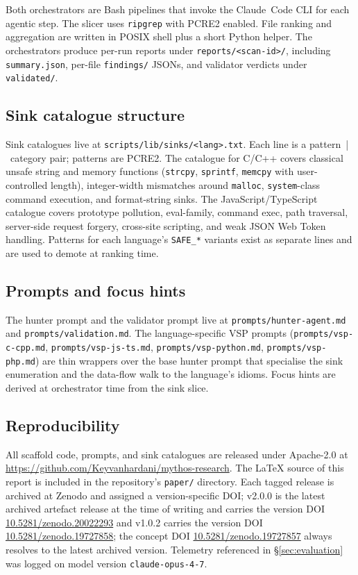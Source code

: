 \documentclass[11pt,a4paper]{article}
\begin{document}
\noindent
Both orchestrators are Bash pipelines that invoke the Claude~Code CLI
for each agentic step. The slicer uses \texttt{ripgrep} with PCRE2
enabled. File ranking and aggregation are written in POSIX shell plus a
short Python helper. The orchestrators produce per-run reports under
\texttt{reports/\textless scan-id\textgreater/}, including
\texttt{summary.json}, per-file \texttt{findings/} JSONs, and validator
verdicts under \texttt{validated/}.

\subsection{Sink catalogue structure}

Sink catalogues live at \texttt{scripts/lib/sinks/\textless lang\textgreater.txt}. Each
line is a pattern~|~category pair; patterns are PCRE2. The catalogue for
C/C++ covers classical unsafe string and memory functions
(\texttt{strcpy}, \texttt{sprintf}, \texttt{memcpy} with user-controlled
length), integer-width mismatches around \texttt{malloc},
\texttt{system}-class command execution, and format-string sinks. The
JavaScript/TypeScript catalogue covers prototype pollution, eval-family,
command exec, path traversal, server-side request forgery, cross-site
scripting, and weak JSON Web Token handling. Patterns for each
language's \texttt{SAFE\_*} variants exist as separate lines and are
used to demote at ranking time.

\subsection{Prompts and focus hints}

The hunter prompt and the validator prompt live at
\texttt{prompts/hunter-agent.md} and \texttt{prompts/validation.md}. The
language-specific VSP prompts (\texttt{prompts/vsp-c-cpp.md},
\texttt{prompts/vsp-js-ts.md}, \texttt{prompts/vsp-python.md},
\texttt{prompts/vsp-php.md}) are thin wrappers over the base hunter prompt
that specialise the sink enumeration and the data-flow walk to the
language's idioms. Focus hints are derived at orchestrator time from the
sink slice.

\subsection{Reproducibility}
\label{sec:reproducibility}

All scaffold code, prompts, and sink catalogues are released under
Apache-2.0 at \url{https://github.com/Keyvanhardani/mythos-research}.
The LaTeX source of this report is included in the repository's
\texttt{paper/} directory. Each tagged release is archived at Zenodo and
assigned a version-specific DOI; v2.0.0 is the latest archived artefact
release at the time of writing and carries the version DOI
\href{https://doi.org/10.5281/zenodo.20022293}{10.5281/zenodo.20022293}
and v1.0.2 carries the version DOI
\href{https://doi.org/10.5281/zenodo.19727858}{10.5281/zenodo.19727858};
the concept DOI
\href{https://doi.org/10.5281/zenodo.19727857}{10.5281/zenodo.19727857}
always resolves to the latest archived version. Telemetry referenced in
\S\ref{sec:evaluation} was logged on model version
\texttt{claude-opus-4-7}.
\end{document}
